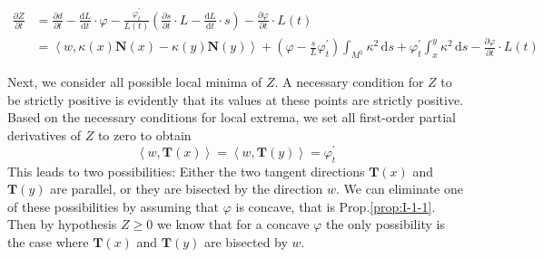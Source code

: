 \begin{align*}
    \frac{\partial Z}{\partial t}&=\frac{\partial d}{\partial t}-\frac{\mathrm{d}L}{\mathrm{d}t}\cdot\varphi-\frac{\varphi^\prime_t}{L(t)}\left(\frac{\partial s}{\partial t}\cdot L-\frac{\mathrm{d}L}{\mathrm{d}t}\cdot s\right)-\frac{\partial\varphi}{\partial t}\cdot L(t)\\
    &=\left<w,\kappa(x)\mathbf{N}(x)-\kappa(y)\mathbf{N}(y)\right>+\left(\varphi-\frac{s}{L}\varphi^\prime_t\right)\int_{M^1}\kappa^2\,\mathrm{d}s+\varphi^\prime_t\int^y_x\kappa^2\,\mathrm{d}s-\frac{\partial\varphi}{\partial t}\cdot L(t)
\end{align*}

Next, we consider all possible local minima of $Z$. A necessary condition for $Z$ to be strictly positive is evidently that its values at these points are strictly positive. Based on the necessary conditions for local extrema, we set all first-order partial derivatives of $Z$ to zero to obtain
\begin{equation*}
    \left<w,\mathbf{T}(x)\right>=\left<w,\mathbf{T}(y)\right>=\varphi^\prime_t
\end{equation*}
This leads to two possibilities: Either the two tangent directions $\mathbf{T}(x)$ and $\mathbf{T}(y)$ are parallel, or they are bisected by the direction $w$. We can eliminate one of these possibilities by assuming that $\varphi$ is concave, that is Prop.\ref{prop:I-1-1}. Then by hypothesis $Z\ge 0$ we know that for a concave $\varphi$ the only possibility is the case where $\mathbf{T}(x)$ and $\mathbf{T}(y)$ are bisected by $w$.


